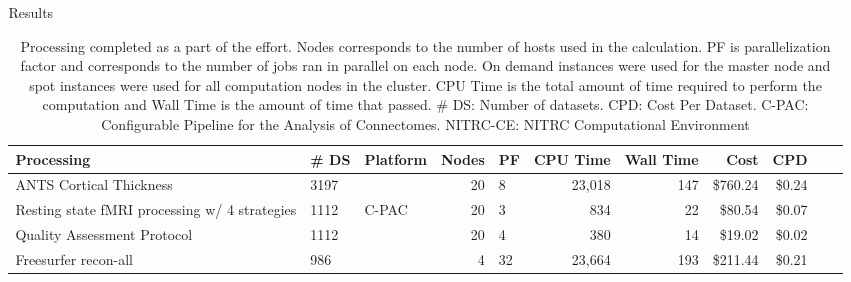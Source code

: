 \documentclass[final,hyperref={pdfpagelabels=false}]{beamer}
\newlength{\columnheight}
\begin{document}
\begin{frame}
\begin{columns}
\begin{column}{.5\textwidth}
    \end{column}
    \begin{column}{.5\textwidth}
        \parbox[t][\columnheight]{\textwidth}{ %
        \begin{block}{Results}
            \begin{center}
                \begin{table}
                    \caption{Processing completed as a part of the effort. Nodes corresponds to the number of hosts used in the calculation. PF is parallelization factor and corresponds to the number of jobs ran in parallel on each node. On demand instances were used for the master node and spot instances were used for all computation nodes in the cluster. CPU Time is the total amount of time required to perform the computation and Wall Time is the amount of time that passed. \# DS: Number of datasets. CPD: Cost Per Dataset. C-PAC: Configurable Pipeline for the Analysis of Connectomes. NITRC-CE: NITRC Computational Environment}
                    \begin{tabularx}{\textwidth}{XXlrl*{6}{r}}
                        {\bf Processing} & {\bf \# DS} & {\bf Platform} & {\bf Nodes} & {\bf PF} & {\bf CPU Time} & {\bf Wall Time} & {\bf Cost} & {\bf CPD}\\
                        \hline
                        ANTS Cortical Thickness & 3197 &  & 20 & 8 & 23,018 & 147 & \$760.24 & \$0.24\\
                        Resting state fMRI processing w/ 4 strategies & 1112 & C-PAC  & 20 & 3 & 834 & 22 & \$80.54 & \$0.07\\
                        Quality Assessment Protocol & 1112 & & 20 & 4 & 380 & 14 & \$19.02 & \$0.02\\
                        \hline
                        Freesurfer recon-all & 986 &  & 4 & 32 & 23,664 & 193 & \$211.44 & \$0.21\\

\end{tabularx}
\end{table}
\end{center}
\end{block}}
\end{column}
\end{columns}
\end{frame}
\end{document}
